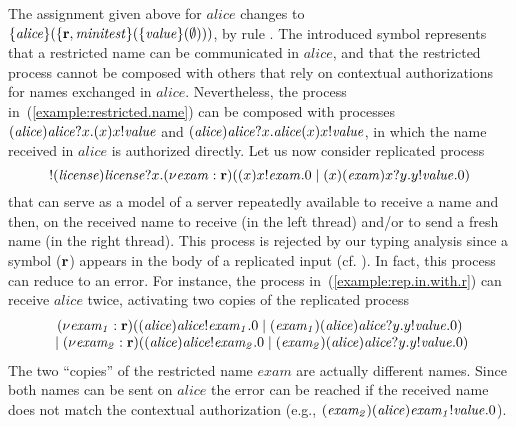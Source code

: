 The assignment given above for $\mathit{alice}$ changes to $\{\mathit{alice}\}( \{{\mathbf{r}}, \mathit{minitest}\} (\{ \mathit{value} \}(\emptyset)))$, by rule . The introduced symbol represents that a restricted name can be communicated in $\mathit{alice}$, and that the restricted process cannot be composed with others that rely on contextual authorizations for names exchanged in $\mathit{alice}$.
Nevertheless, the process in~(\ref{example:restricted.name}) can be composed with processes $(\mathit{alice})\mathit{alice}?x.(x)x!\mathit{value}$ and $(\mathit{alice})\mathit{alice}?x.\mathit{alice}(x)x!\mathit{value}$, in which the name received in $\mathit{alice}$ is authorized directly.
%
Let us now consider replicated process 
\begin{equation}\label{example:rep.in.with.r}
!({\mathit{license}}){\mathit{license}}?x.(\nu \mathit{exam}: {\mathbf{r}})((x)x!\mathit{exam}.0 \;|\; (x)(\mathit{exam})x?y.y!\mathit{value}.0)
\end{equation}
that can serve as a model of a server repeatedly available to receive a name and then,  on the received name to receive (in the left thread) and/or to send a fresh name (in the right thread). This process is rejected by our typing analysis since a symbol (${\mathbf{r}}$) appears in the body of a replicated input (cf. ). In fact, this process can reduce to an error. For instance, the process in~(\ref{example:rep.in.with.r}) can receive $\mathit{alice}$ twice, activating two copies of the replicated process
\begin{equation}\label{example:error.rep}
\begin{array}{c}
(\nu \mathit{exam_1}: {\mathbf{r}})((\mathit{alice})\mathit{alice}!\mathit{exam_1}.0 \;|\; (\mathit{exam_1})(\mathit{alice})\mathit{alice}?y.y!\mathit{value}.0) 
\\
\;|\;
(\nu \mathit{exam_2}: {\mathbf{r}})((\mathit{alice})\mathit{alice}!\mathit{exam_2}.0 \;|\; (\mathit{exam_2})(\mathit{alice})\mathit{alice}?y.y!\mathit{value}.0) 
\end{array}
\end{equation}
The two ``copies'' of the restricted name $\mathit{exam}$ are actually different names. Since both names can be sent on $\mathit{alice}$ the error can be reached if the received name does not match the contextual authorization (e.g., $(\mathit{exam_2})(\mathit{alice})\mathit{exam_1}!\mathit{value}.0$). 

